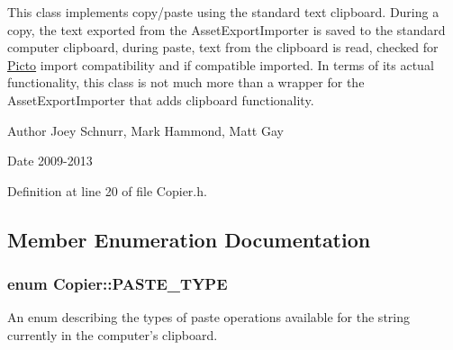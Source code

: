 This class implements copy/paste using the standard text clipboard. During a copy, the text exported from the Asset\-Export\-Importer is saved to the standard computer clipboard, during paste, text from the clipboard is read, checked for \hyperlink{namespace_picto}{Picto} import compatibility and if compatible imported. In terms of its actual functionality, this class is not much more than a wrapper for the Asset\-Export\-Importer that adds clipboard functionality. \begin{DoxyAuthor}{Author}
Joey Schnurr, Mark Hammond, Matt Gay 
\end{DoxyAuthor}
\begin{DoxyDate}{Date}
2009-\/2013 
\end{DoxyDate}


Definition at line 20 of file Copier.\-h.



\subsection{Member Enumeration Documentation}
\hypertarget{class_copier_a6bbbcb9f46198d2d909e72251dbc7fd0}{
\subsubsection[{P\-A\-S\-T\-E\-\_\-\-T\-Y\-P\-E}]{\setlength{\rightskip}{0pt plus 5cm}enum {\bf Copier\-::\-P\-A\-S\-T\-E\-\_\-\-T\-Y\-P\-E}}}\label{class_copier_a6bbbcb9f46198d2d909e72251dbc7fd0}


An enum describing the types of paste operations available for the string currently in the computer's clipboard. 

